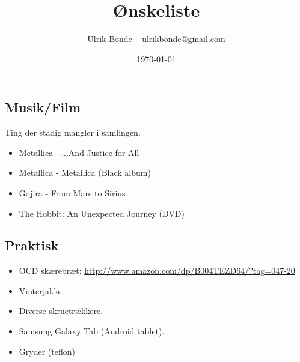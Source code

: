 \documentclass[a4paper, danish, 10pt, final]{article}
\title{Ønskeliste}
\author{Ulrik Bonde -- ulrikbonde@gmail.com}
\date{\today}
\begin{document}
\maketitle



\subsection*{Musik/Film}
Ting der stadig mangler i samlingen.
\begin{itemize}
    \item Metallica - ...And Justice for All
    \item Metallica - Metallica (Black album)
    \item Gojira - From Mars to Sirius
    \item The Hobbit: An Unexpected Journey (DVD)
\end{itemize}


\subsection*{Praktisk}
\begin{itemize}
    \item OCD skærebræt: \url{http://www.amazon.com/dp/B004TEZD64/?tag=047-20}
    \item Vinterjakke.
    \item Diverse skruetrækkere.
    \item Samsung Galaxy Tab (Android tablet).
    \item Gryder (teflon)
\end{itemize}


%
%
\end{document}
